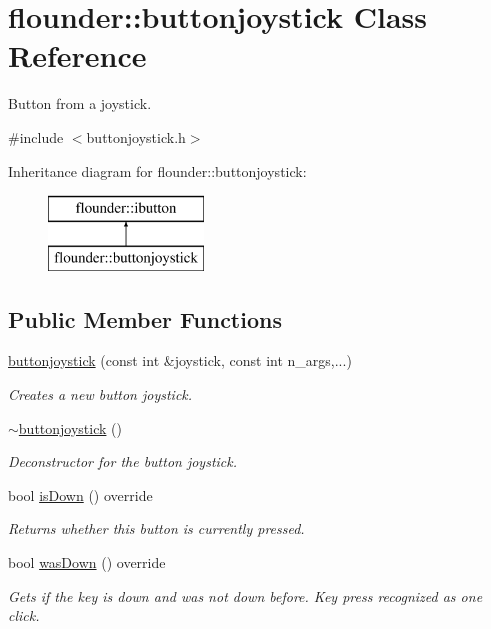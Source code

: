 \hypertarget{classflounder_1_1buttonjoystick}{}\section{flounder\+:\+:buttonjoystick Class Reference}
\label{classflounder_1_1buttonjoystick}


Button from a joystick.  




{\ttfamily \#include $<$buttonjoystick.\+h$>$}

Inheritance diagram for flounder\+:\+:buttonjoystick\+:\begin{figure}[H]
\begin{center}
\leavevmode
\includegraphics[height=2.000000cm]{classflounder_1_1buttonjoystick}
\end{center}
\end{figure}
\subsection*{Public Member Functions}
\begin{DoxyCompactItemize}
\item 
\hyperlink{classflounder_1_1buttonjoystick_a1b31996ff3588c033e85839aef2d35c8}{buttonjoystick} (const int \&joystick, const int n\+\_\+args,...)
\begin{DoxyCompactList}\small\item\em Creates a new button joystick. \end{DoxyCompactList}\item 
\hyperlink{classflounder_1_1buttonjoystick_aece2e8931c528cef0a266f17b2eba88b}{$\sim$buttonjoystick} ()
\begin{DoxyCompactList}\small\item\em Deconstructor for the button joystick. \end{DoxyCompactList}\item 
bool \hyperlink{classflounder_1_1buttonjoystick_ab6682d3554e007ef473c4595339f86f1}{is\+Down} () override
\begin{DoxyCompactList}\small\item\em Returns whether this button is currently pressed. \end{DoxyCompactList}\item 
bool \hyperlink{classflounder_1_1buttonjoystick_a99302b1345fa773ec839290ae6c406e7}{was\+Down} () override
\begin{DoxyCompactList}\small\item\em Gets if the key is down and was not down before. Key press recognized as one click. \end{DoxyCompactList}\end{DoxyCompactItemize}
